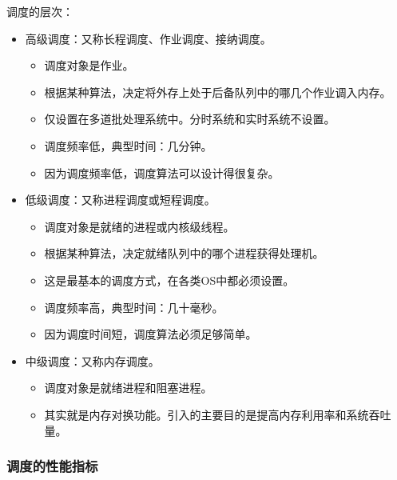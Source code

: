 \documentclass[12pt, a4paper, oneside]{ctexart}
\begin{document}
调度的层次：
\begin{itemize}
  \item 高级调度：又称长程调度、作业调度、接纳调度。
  \begin{itemize}
    \item 调度对象是作业。
    \item 根据某种算法，决定将外存上处于后备队列中的哪几个作业调入内存。
    \item 仅设置在多道批处理系统中。分时系统和实时系统不设置。
    \item 调度频率低，典型时间：几分钟。
    \item 因为调度频率低，调度算法可以设计得很复杂。
  \end{itemize}
  \item 低级调度：又称进程调度或短程调度。
  \begin{itemize}
    \item 调度对象是就绪的进程或内核级线程。
    \item 根据某种算法，决定就绪队列中的哪个进程获得处理机。
    \item 这是最基本的调度方式，在各类OS中都必须设置。
    \item 调度频率高，典型时间：几十毫秒。
    \item 因为调度时间短，调度算法必须足够简单。
  \end{itemize}
  \item 中级调度：又称内存调度。
  \begin{itemize}
    \item 调度对象是就绪进程和阻塞进程。
    \item 其实就是内存对换功能。引入的主要目的是提高内存利用率和系统吞吐量。
  \end{itemize}
\end{itemize}

\subsubsection{调度的性能指标}
\end{document}
